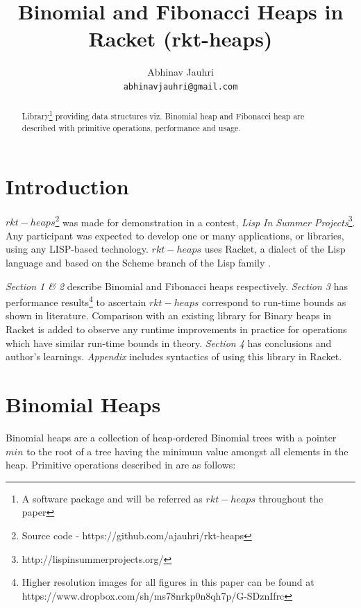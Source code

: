 \documentclass{llncs}
\title{Binomial and Fibonacci Heaps in Racket (rkt-heaps)}
\begin{document}
\author{
	Abhinav Jauhri\\
	\texttt{abhinavjauhri@gmail.com}\\
}

\maketitle

\begin{abstract}
	Library\footnote{A software package and will be referred as $rkt-heaps$ throughout the paper} providing data structures viz. Binomial heap \cite{vuillemin1978data} and Fibonacci heap\cite{fredman1987fibonacci} are described with primitive operations, performance and usage. 
\end{abstract}

\section{Introduction}
$rkt-heaps$\footnote{Source code - https://github.com/ajauhri/rkt-heaps} was made for demonstration in a contest, \textit{Lisp In Summer Projects}\footnote{http://lispinsummerprojects.org/}. Any participant was expected to develop one or many applications, or libraries, using any LISP-based technology. $rkt-heaps$ uses Racket, a dialect of the Lisp language and based on the Scheme branch of the Lisp family \cite{racket_dialect}. 

\emph{Section 1 \& 2} describe Binomial and Fibonacci heaps respectively. \emph{Section 3} has performance results\footnote{Higher resolution images for all figures in this paper can be found at https://www.dropbox.com/sh/ms78nrkp0n8qh7p/G-SDznIfrc} to ascertain $rkt-heaps$ correspond to run-time bounds as shown in literature. Comparison with an existing library for Binary heaps\cite{racket_binary} in Racket is added to observe any runtime improvements in practice for operations which have similar run-time bounds in theory. \emph{Section 4} has conclusions and author's learnings. \emph{Appendix} includes syntactics of using this library in Racket. 

\section{Binomial Heaps}
Binomial heaps are a collection of heap-ordered Binomial trees with a pointer $min$ to the root of a tree having the minimum value amongst all elements in the heap. Primitive operations described in \cite{kozen1992design} are as follows: \\
\end{document}
